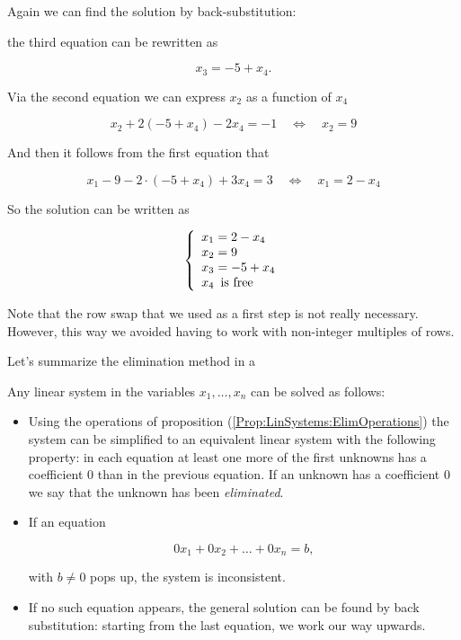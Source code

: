 \begin{ex}
Again we can find the solution by back-substitution:

the third equation can be rewritten as

$$

  x_3 = -5 + x_4.
$$

Via the second equation we can express $x_2$ as a function of $x_4$

$$

  x_2 + 2(-5+x_4) -2x_4 = -1 \quad \iff \quad 
  x_2 = 9  
$$

And then it follows from the first equation that

$$

 x_1 - 9 - 2\cdot(-5+x_4) + 3x_4 = 3 \quad \iff \quad 
 x_1 = 2 -x_4
$$

So the solution can be written as

$$

  \left\{
\begin{array}{l}
       x_1 = 2 -x_4 \\
       x_2 = 9 \\
       x_3 = -5 + x_4\\
       x_4 \text{\, is free}
    \end{array}\right.
$$


Note that the row swap that we used as a first step  is not really necessary. However, this way we avoided having to work with non-integer multiples of rows.
\end{ex}

Let's summarize the elimination method in a 

\begin{summ}
\label{Summ:LinSystems:EliminationMethod}
Any linear system in the variables $x_1,\ldots, x_n$ can be solved as follows:

\begin{itemize}
\item Using the operations of proposition (\ref{Prop:LinSystems:ElimOperations}) the system can be simplified to an equivalent linear system with the following property: in each equation at least one more of the first unknowns has a coefficient 0 than in the previous equation.  If an unknown has a coefficient 0 we say that the unknown has been \emph{eliminated}.

\item If an equation 

$$

  0x_1 + 0x_2 + \ldots + 0x_n = b,
$$

with  $b\neq 0$  pops up, the system is inconsistent.

\item If no such equation appears, the general solution can be found by back substitution:  starting from the last equation, we work our way upwards. 
\end{itemize}

\end{summ}
 
